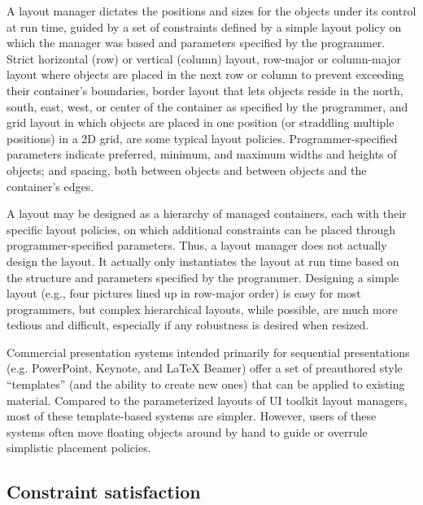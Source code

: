     A layout manager dictates the positions and sizes for the objects under its
    control at run time, guided by a set of constraints defined by a simple
    layout policy on which the manager was based and parameters specified by
    the programmer. Strict horizontal (row) or vertical (column) layout,
    row-major or column-major layout where objects are placed in the next row
    or column to prevent exceeding their container’s boundaries, border layout
    that lets objects reside in the north, south, east, west, or center of the
    container as specified by the programmer, and grid layout in which objects
    are placed in one position (or straddling multiple positions) in a 2D grid,
    are some typical layout policies. Programmer-specified parameters indicate
    preferred, minimum, and maximum widths and heights of objects; and spacing,
    both between objects and between objects and the container’s edges. 

    A layout may be designed as a hierarchy of managed containers, each with
    their specific layout policies, on which additional constraints can be
    placed through programmer-specified parameters. Thus, a layout manager
    does not actually design the layout. It actually only instantiates the
    layout at run time based on the structure and parameters specified by the
    programmer. Designing a simple layout (e.g., four pictures lined up in
    row-major order) is easy for most programmers, but complex hierarchical
    layouts, while possible, are much more tedious and difficult, especially if
    any robustness is desired when resized.

    Commercial presentation systems intended primarily for sequential
    presentations (e.g. PowerPoint, Keynote, and LaTeX Beamer) offer a set of
    preauthored style “templates” (and the ability to create new ones) that can
    be applied to existing material. Compared to the parameterized layouts of
    UI toolkit layout managers, most of these template-based systems are
    simpler. However, users of these systems often move floating objects
    around by hand to guide or overrule simplistic placement policies.


   \subsection{Constraint satisfaction}
    \label{constraint-satisfaction}

